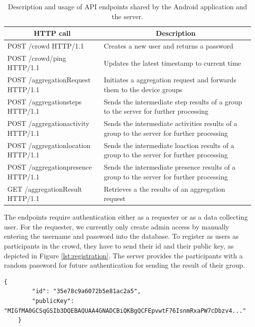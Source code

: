 \begin{table}[htbp]
\centering
  \begin{tabularx}{0.92\textwidth}{|l|X|}                                                                             \hline
        \multicolumn{1}{|c|}{\textbf{HTTP call}} & \multicolumn{1}{c|}{\textbf{Description}} \\ [0.5ex] 
        \hline
        POST /crowd HTTP/1.1 & Creates a new user and returns a password \\
        \hline
        POST /crowd/ping HTTP/1.1 & Updates the latest timestamp to current time \\
        \hline
        POST /aggregationRequest HTTP/1.1 & Initiates a aggregation request and forwards them to the device groups \\ 
        \hline
        POST /aggregationsteps HTTP/1.1 & Sends the intermediate step results of a group to the server for further processing  \\ 
        \hline
        POST /aggregationactivity HTTP/1.1 & Sends the intermediate activities results of a group to the server for further processing  \\ 
        \hline
        POST /aggregationlocation HTTP/1.1 & Sends the intermediate loaction results of a group to the server for further processing  \\ 
        \hline
        POST /aggregationpresence HTTP/1.1 & Sends the intermediate presence results of a group to the server for further processing  \\ 
        \hline
        GET /aggregationResult HTTP/1.1 & Retrieves a the results of an aggregation request \\ 
        \hline
  \end{tabularx}
  \caption{Description and usage of API endpoints shared by the Android application and the server.}
  \label{tab:rest}
\end{table}

The endpoints require authentication either as a requester or as a data collecting user. For the requester, we currently only create admin access by manually entering the username and password into the database. To register as users as participants in the crowd, they have to send their id and their public key, as depicted in Figure \ref{lst:registration}. The server provides the participants with a random password for future authentication for sending the result of their group.

\begin{lstlisting}[caption=Body of an HTTP request for creating a new user., label={lst:registration}]
    {
        "id": "35e78c9a6072b5e81ac2a5",
        "publicKey": "MIGfMA0GCSqGSIb3DQEBAQUAA4GNADCBiQKBgQCFEpvwtF76IsnmRxaPW7cDbzv4..."
    }
\end{lstlisting}

